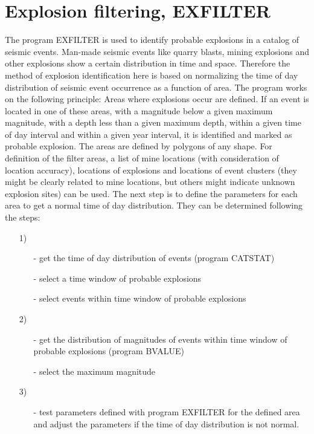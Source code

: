 
\section{Explosion filtering, EXFILTER} 
\label{sect:exfilter}

 The program EXFILTER is used to identify probable explosions in a catalog of seismic events. Man-made seismic events like quarry blasts, mining explosions and other explosions show a certain distribution in time and space. Therefore the method of explosion identification here is based on normalizing the time of day distribution of seismic event occurrence as a function of area. The program works on the following principle: Areas where explosions occur are defined. If an event is located in one of these areas, with a magnitude below a given maximum magnitude, with a depth less than a given maximum depth, within a given time of day interval and within a given year interval, it is identified and marked as probable explosion. The areas are defined by polygons of any shape. For definition of the filter areas, a list of mine locations (with consideration of location accuracy), locations of explosions and locations of event clusters (they might be clearly related to mine locations, but others might indicate unknown explosion sites) can be used. The next step is to define the parameters for each area to get a normal time of day distribution. They can be determined following the steps: 

\begin{itemize}
\item[1)]
\begin{itemize}
\item[]
- get the time of day distribution of events (program CATSTAT) 
\item[]
- select a time window of probable explosions 
\item[]
- select events within time window of probable explosions 
\end{itemize}
\item[2)]
\begin{itemize}
\item[]
- get the distribution of magnitudes of events within time window of probable explosions (program BVALUE) 
\item[]
- select the maximum magnitude 
\end{itemize}
\item[3)]
\begin{itemize}
\item[]
- test parameters defined with program EXFILTER for the defined area and adjust the parameters if the time of day distribution is not normal. 
\end{itemize}
\end{itemize}

